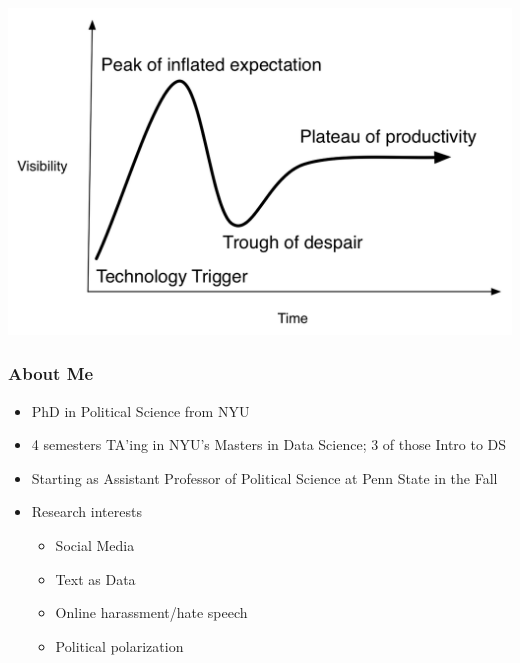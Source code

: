 \documentclass{beamer}
\begin{document}
\begin{frame}
	
	\begin{center}
		\includegraphics[width=\textwidth]{figures/hype_cycle}
	\end{center}
	
	
	
\end{frame}

\begin{frame}
	\frametitle{About Me}
	\begin{itemize}
		
		\item PhD in Political Science from NYU
		\pause
		\vspace{1em}
		\item 4 semesters TA'ing in NYU's Masters in Data Science; 3 of those Intro to DS
		\pause
		\vspace{1em}
		\item Starting as Assistant Professor of Political Science at Penn State in the Fall
		\pause
		\vspace{1em}
		\item Research interests
		
		\pause
\begin{itemize}
	\item Social Media
	\pause 
	\item Text as Data
	\pause 
	\item Online harassment/hate speech
	\pause
	\item Political polarization
\end{itemize}

		
	\end{itemize}
\end{frame}
	
\end{document}
